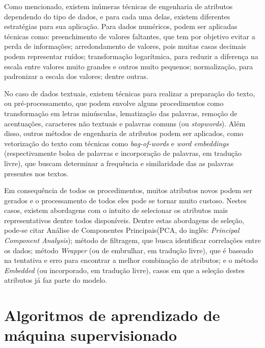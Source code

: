 \documentclass[oneside,openright,12pt]{ufsm_2015} %
\begin{document}
    \par Como mencionado, existem inúmeras técnicas de engenharia de atributos dependendo do tipo de dados, e para cada uma delas, existem diferentes estratégias para sua aplicação. Para dados numéricos, podem ser aplicadas técnicas como: preenchimento de valores faltantes, que tem por objetivo evitar a perda de informações; arredondamento de valores, pois muitas casas decimais podem representar ruídos; transformação logarítmica, para reduzir a diferença na escala entre valores muito grandes e outros muito pequenos; normalização, para padronizar a escala dos valores; dentre outras.
    
    \par No caso de dados textuais, existem técnicas para realizar a preparação do texto, ou pré-processamento, que podem envolve alguns procedimentos como transformação em letras minúsculas, lematização das palavras, remoção de acentuações, caracteres não textuais e palavras comuns (ou \textit{stopwords}). Além disso, outros métodos de engenharia de atributos podem ser aplicados, como vetorização do texto com técnicas como \textit{bag-of-words} e \textit{word embeddings} (respectivamente bolsa de palavras e incorporação de palavras, em tradução livre), que buscam determinar a frequência e similaridade das as palavras presentes nos textos.
    
    \par Em consequência de todos os procedimentos, muitos atributos novos podem ser gerados e o processamento de todos eles pode se tornar muito custoso. Nestes casos, existem abordagens com o intuito de selecionar os atributos mais representativos dentre todos disponíveis. Dentre estas abordagens de seleção, pode-se citar Análise de Componentes Principais(PCA, do inglês: \textit{Principal Component Analysis}); método de filtragem, que busca identificar correlações entre os dados; método \textit{Wrapper} (ou de embrulhar, em tradução livre), que é baseado na tentativa e erro para encontrar a melhor combinação de atributos; e o método \textit{Embedded} (ou incorporado, em tradução livre), casos em que a seleção destes atributos já faz parte do modelo.


\section{Algoritmos de aprendizado de máquina supervisionado}
\label{sec:alg-aprend-maquina-sup}
\end{document}
